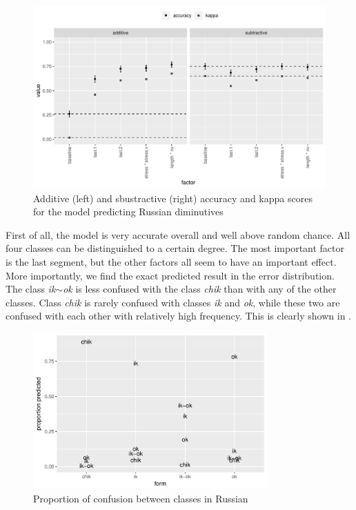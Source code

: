 \begin{figure}
  \centering
  \includegraphics[width=1.0\textwidth]{./figures/russian/factimp-plot.pdf}
    \caption{Additive (left) and sbustractive (right) accuracy and kappa scores for the model predicting Russian diminutives}\label{fig:factimp-plot-russian}
\end{figure}

First of all, the model is very accurate overall and well above random chance. All four classes can be distinguished to a certain degree. The most important factor is the last segment, but the other factors all seem to have an important effect. More importantly, we find the exact predicted result in the error distribution. The class \textit{ik$\sim$ok} is less confused with the class \textit{chik} than with any of the other classes. Class \textit{chik} is rarely confused with classes \textit{ik} and \textit{ok}, while these two are confused with each other with relatively high frequency. This is clearly shown in .

\begin{figure}
  \centering
  \includegraphics[width=0.8\textwidth]{./figures/russian/rus.pdf}
  \caption{Proportion of confusion between classes in Russian}\label{fig:russian-results}
\end{figure}


